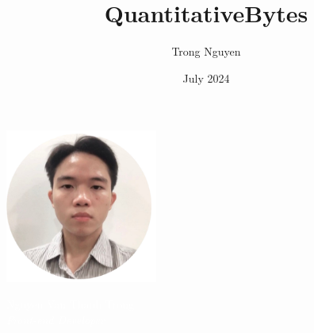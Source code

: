 \documentclass[11pt,oneside,a4paper,titlepage]{article}
\title{QuantitativeBytes}
\author{Trong Nguyen}
\date{July 2024}
\begin{document}
\begin{tcolorbox}
    \begin{minipage}{4.5cm}
    \hspace*{0.5cm}\includegraphics[width=5cm]{myface.png} %
    \end{minipage}
    \begin{minipage}{15cm}
        \begin{center}
            \Huge{\textcolor{white}{Nguyen Van Thanh Trong}} \\
            \vspace*{0.5cm}
            \Large{\textcolor{white}{\emph{Front-end Developer}}}
        \end{center}
    \end{minipage}
\end{tcolorbox}
\end{document}
